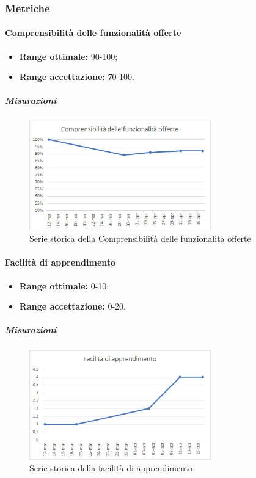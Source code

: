 		\subsubsection{Metriche}
			\paragraph{Comprensibilità delle funzionalità offerte} \Spazio 
			\begin{itemize}
				\item {\textbf{Range ottimale:} 90-100;}
				\item {\textbf{Range accettazione:} 70-100.}
			\end{itemize} 
		   \subparagraph{Misurazioni}
		    \begin{figure}[H]
		   	\centering 
		    	\includegraphics[width=0.7\textwidth]{Images/compr.png}
		    	\caption{Serie storica della Comprensibilità delle funzionalità offerte}
		    	\label{compr} 
		    \end{figure}
			\paragraph{Facilità di apprendimento} \Spazio 
			\begin{itemize}
				\item {\textbf{Range ottimale:} 0-10;}
				\item {\textbf{Range accettazione:} 0-20.}
			\end{itemize} 
			 \subparagraph{Misurazioni}
			\begin{figure}[H]
				\centering 
				\includegraphics[width=0.7\textwidth]{Images/fac.png}
				\caption{Serie storica della facilità di apprendimento}
				\label{fac} 
			\end{figure}
